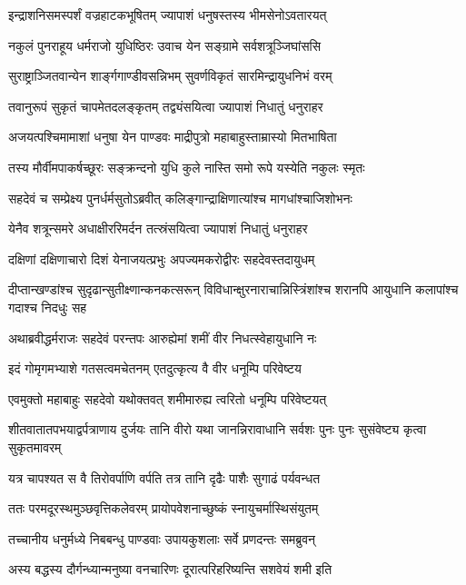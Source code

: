 \twolineshloka
{इन्द्राशनिसमस्पर्शं वज्रहाटकभूषितम्}
{ज्यापाशं धनुषस्तस्य भीमसेनोऽवतारयत्}


\twolineshloka
{नकुलं पुनराहूय धर्मराजो युधिष्ठिरः}
{उवाच येन सङ्ग्रामे सर्वशत्रूञ्जिघांससि}


\twolineshloka
{सुराष्ट्राञ्जितवान्येन शार्ङ्गगाण्डीवसन्निभम्}
{सुवर्णविकृतं सारमिन्द्रायुधनिभं वरम्}


\twolineshloka
{तवानुरूपं सुकृतं चापमेतदलङ्कृतम्}
{तद्व्यंसयित्वा ज्यापाशं निधातुं धनुराहर}



\twolineshloka
{अजयत्पश्चिमामाशां धनुषा येन पाण्डवः}
{माद्रीपुत्रो महाबाहुस्ताम्रास्यो मितभाषिता}


\twolineshloka
{तस्य मौर्वीमपाकर्षच्छूरः सङ्क्रन्दनो युधि}
{कुले नास्ति समो रूपे यस्येति नकुलः स्मृतः}


\twolineshloka
{सहदेवं च सम्प्रेक्ष्य पुनर्धर्मसुतोऽब्रवीत्}
{कलिङ्गान्द्राक्षिणात्यांश्च मागधांश्चाजिशोभनः}


\twolineshloka
{येनैव शत्रून्समरे अधाक्षीररिमर्दन}
{तत्स्रंसयित्वा ज्यापाशं निधातुं धनुराहर}



\twolineshloka
{दक्षिणां दक्षिणाचारो दिशं येनाजयत्प्रभुः}
{अपज्यमकरोद्वीरः सहदेवस्तदायुधम्}


\threelineshloka
{दीप्तान्खण्डांश्च सुदृढान्सुतीक्ष्णान्कनकत्सरून्}
{विविधान्क्षुरनाराचान्निस्त्रिंशांश्च शरानपि}
{आयुधानि कलापांश्च गदाश्च निदधुः सह}


\twolineshloka
{अथाब्रवीद्धर्मराजः सहदेवं परन्तपः}
{आरुह्येमां शमीं वीर निधत्स्वेहायुधानि नः}


\twolineshloka
{इदं गोमृगमभ्याशे गतसत्वमचेतनम्}
{एतदुत्कृत्य वै वीर धनूम्पि परिवेष्टय}


\twolineshloka
{एवमुक्तो महाबाहुः सहदेवो यथोक्तवत्}
{शमीमारुह्य त्वरितो धनूम्पि परिवेष्टयत्}


\threelineshloka
{शीतवातातपभयाद्वर्पत्राणाय दुर्जयः}
{तानि वीरो यथा जानन्निरावाधानि सर्वशः}
{पुनः पुनः सुसंवेष्ट्य कृत्वा सुकृतमावरम्}


\twolineshloka
{यत्र चापश्यत स वै तिरोवर्पाणि वर्पति}
{तत्र तानि दृढैः पाशैः सुगाढं पर्यवन्धत}


\twolineshloka
{ततः परमदूरस्थमुञ्छवृत्तिकलेवरम्}
{प्रायोपवेशनाच्छुष्कं स्नायुचर्मास्थिसंयुतम्}


\twolineshloka
{तच्चानीय धनुर्मध्ये निबबन्धु पाण्डवाः}
{उपायकुशलाः सर्वे प्रणदन्तः समब्रुवन्}


\twolineshloka
{अस्य बद्धस्य दौर्गन्ध्यान्मनुष्या वनचारिणः}
{दूरात्परिहरिष्यन्ति सशवेयं शमी इति}


